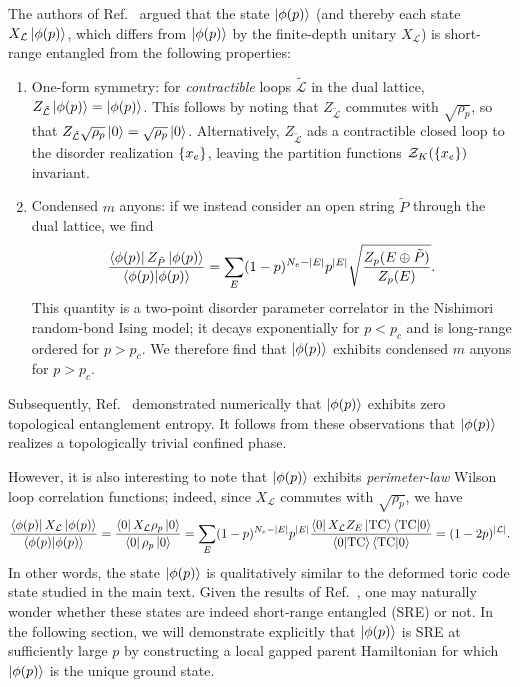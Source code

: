 The authors of Ref.~ argued that the state $\ket{\phi(p)}$ (and thereby each state $X_{\mathcal{L}} \ket{\phi(p)}$, which differs from $\ket{\phi(p)}$ by the finite-depth unitary $X_{\mathcal{L}}$) is short-range entangled from the following properties:
\begin{enumerate}
    \item One-form symmetry: for \emph{contractible} loops $\tilde{\mathcal{L}}$ in the dual lattice, $Z_{\tilde{\mathcal{L}}} \ket{\phi(p)} = \ket{\phi(p)}$. This follows by noting that $Z_{\tilde{\mathcal{L}}}$ commutes with $\sqrt{\rho_p}$, so that $Z_{\tilde{\mathcal{L}}} \sqrt{\rho_p} \ket{0} = \sqrt{\rho_p} \ket{0}$. Alternatively, $Z_{\tilde{\mathcal{L}}}$ ads a contractible closed loop to the disorder realization $\qty{x_e}$, leaving the partition functions $\mathcal{Z}_K(\qty{x_e})$ invariant.

    \item Condensed $m$ anyons: if we instead consider an open string $\tilde{P}$ through the dual lattice, we find
    \begin{equation}
        \frac{\bra{\phi(p)} Z_{\tilde{P}} \ket{\phi(p)}}{\bra{\phi(p)} \ket{\phi(p)}} = \sum_E (1-p)^{N_e - |E|} p^{|E|} \sqrt{\frac{Z_p(E \oplus \tilde{P})}{Z_p(E)}} .
    \end{equation}
    This quantity is a two-point disorder parameter correlator in the Nishimori random-bond Ising model; it decays exponentially for $p < p_c$ and is long-range ordered for $p > p_c$. We therefore find that $\ket{\phi(p)}$ exhibits condensed $m$ anyons for $p > p_c$. 
\end{enumerate}
Subsequently, Ref.~ demonstrated numerically that $\ket{\phi(p)}$ exhibits zero topological entanglement entropy. It follows from these observations that $\ket{\phi(p)}$ realizes a topologically trivial confined phase. 

However, it is also interesting to note that $\ket{\phi(p)}$ exhibits \emph{perimeter-law} Wilson loop correlation functions; indeed, since $X_{\mathcal{L}}$ commutes with $\sqrt{\rho_p}$, we have
\begin{equation}
    \frac{\bra{\phi(p)} X_{\mathcal{L}} \ket{\phi(p)}}{\bra{\phi(p)} \ket{\phi(p)}} = \frac{\bra{0} X_{\mathcal{L}} \rho_p \ket{0}}{\bra{0} \rho_p \ket{0}} = \sum_E (1 -p)^{N_e - |E|} p^{|E|} \frac{\bra{0} X_{\mathcal{L}} Z_E \ket{\text{TC}} \bra{\text{TC}} \ket{0}}{\bra{0} \ket{\text{TC}} \bra{\text{TC}} \ket{0}} = (1 - 2p)^{|\mathcal{L}|} .
\end{equation}
In other words, the state $\ket{\phi(p)}$ is qualitatively similar to the deformed toric code state studied in the main text. Given the results of Ref.~, one may naturally wonder whether these states are indeed short-range entangled (SRE) or not. In the following section, we will demonstrate explicitly that $\ket{\phi(p)}$ is SRE at sufficiently large $p$ by constructing a local gapped parent Hamiltonian for which $\ket{\phi(p)}$ is the unique ground state.

